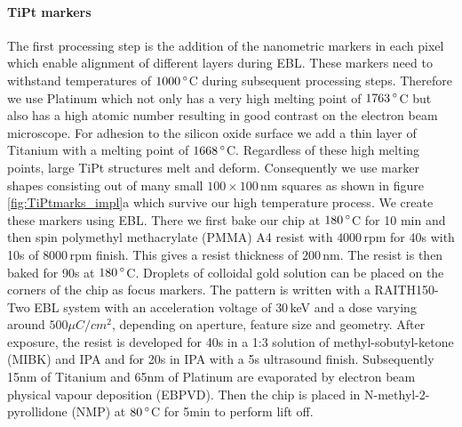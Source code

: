 \paragraph*{TiPt markers}
The first processing step is the addition of the nanometric markers in each pixel which enable alignment of different layers during EBL. These markers need to withstand temperatures of $1000\,\degree$C during subsequent processing steps. Therefore we use Platinum which not only has a very high melting point of $1763\,\degree$C but also has a high atomic number resulting in good contrast on the electron beam microscope. For adhesion to the silicon oxide surface we add a thin layer of Titanium with a melting point of $1668\,\degree$C. Regardless of these high melting points, large TiPt structures melt and deform. Consequently we use marker shapes consisting out of many small $100\times100\,$nm squares as shown in figure \ref{fig:TiPtmarks_impl}a which survive our high temperature process. We create these markers using EBL. There we first bake our chip at $180\,\degree$C for 10 min and then spin polymethyl methacrylate (PMMA) A4 resist with $4000\,$rpm for 40s with 10s of $8000\,$rpm finish. This gives a resist thickness of $200\,$nm. The resist is then baked for 90s at $180\,\degree$C. Droplets of colloidal gold solution can be placed on the corners of the chip as focus markers. The pattern is written with a RAITH150-Two EBL system with an acceleration voltage of $30\,$keV and a dose varying around $500\mu C/cm^2$, depending on aperture, feature size and geometry. After exposure, the resist is developed for 40s in a 1:3 solution of methyl-sobutyl-ketone (MIBK) and IPA and for 20s in IPA with a 5s ultrasound finish. 
Subsequently 15nm of Titanium and 65nm of Platinum are evaporated by electron beam physical vapour deposition (EBPVD). Then the chip is placed in N-methyl-2-pyrollidone (NMP) at $80\,\degree$C for 5min to perform lift off. 


